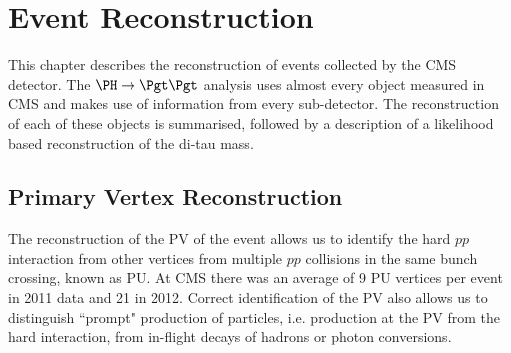 \chapter{Event Reconstruction}
\label{chap:reco}

This chapter describes the reconstruction of events collected by the CMS
detector. The $\PH \to \Pgt\Pgt$ analysis uses almost every object measured in
CMS and makes use of information from every sub-detector. The reconstruction of
each of these objects is summarised, followed by a description of a likelihood based
reconstruction of the di-tau mass. 



\section{Primary Vertex Reconstruction}
\label{sec:vertex}

The reconstruction of the \ac{PV} of the event allows us to identify the hard
$pp$ interaction from other vertices from multiple $pp$ collisions in the same
bunch crossing, known as \ac{PU}. At CMS there was an average of 9
\ac{PU} vertices per event in 2011 data and 21 in 2012. Correct
identification of the \ac{PV} also allows us to distinguish ``prompt" production of
particles, i.e. production at the \ac{PV} from the hard interaction, from
in-flight decays of hadrons or photon conversions.  

